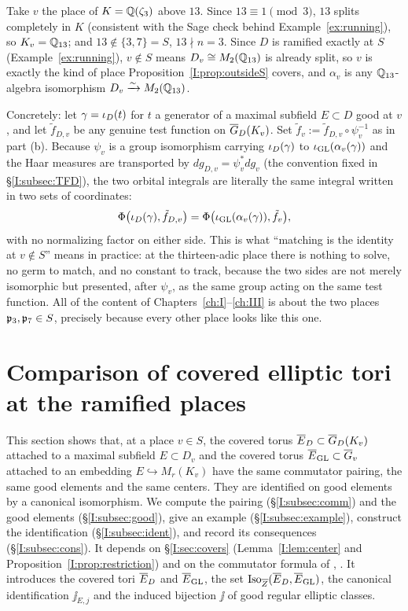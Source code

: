 \begin{example}\label{I:ex:split-matching}
Take $v$ the place of $K=\mathbb{Q}(\zeta_3)$ above $13$. Since $13\equiv1\pmod3$, $13$ splits completely in $K$ (consistent with the Sage check behind Example~\ref{ex:running}), so $K_v=\mathbb{Q}_{13}$; and $13\notin\{3,7\}=S$, $13\nmid n=3$. Since $D$ is ramified exactly at $S$ (Example~\ref{ex:running}), $v\notin S$ means $D_v\cong M_2(\mathbb{Q}_{13})$ is already split, so $v$ is exactly the kind of place Proposition~\ref{I:prop:outsideS} covers, and $\alpha_v$ is any $\mathbb{Q}_{13}$-algebra isomorphism $D_v\xrightarrow{\sim}M_2(\mathbb{Q}_{13})$.

Concretely: let $\gamma=\iota_D(t)$ for $t$ a generator of a maximal subfield $E\subset D$ good at $v$, and let $\tilde f_{D,v}$ be any genuine test function on $\overline{G}_D(K_v)$. Set $\tilde f_v:=\tilde f_{D,v}\circ\psi_v^{-1}$ as in part (b). Because $\psi_v$ is a group isomorphism carrying $\iota_D(\gamma)$ to $\iota_{\mathrm{GL}}(\alpha_v(\gamma))$ and the Haar measures are transported by $dg_{D,v}=\psi_v^*dg_v$ (the convention fixed in \S\ref{I:subsec:TFD}), the two orbital integrals are literally the same integral written in two sets of coordinates:
\[
\Phi\bigl(\iota_D(\gamma),\tilde f_{D,v}\bigr)=\Phi\bigl(\iota_{\mathrm{GL}}(\alpha_v(\gamma)),\tilde f_v\bigr),
\]
with no normalizing factor on either side. This is what ``matching is the identity at $v\notin S$'' means in practice: at the thirteen-adic place there is nothing to solve, no germ to match, and no constant to track, because the two sides are not merely isomorphic but presented, after $\psi_v$, as the same group acting on the same test function. All of the content of Chapters~\ref{ch:I}--\ref{ch:III} is about the two places $\mathfrak p_3,\mathfrak p_7\in S$, precisely because every other place looks like this one.
\end{example}

\section{Comparison of covered elliptic tori at the ramified places}\label{I:sec:tori}
This section shows that, at a place $v\in S$, the covered torus $\overline{E}_D\subset\overline{G}_D(K_v)$ attached to a maximal subfield $E\subset D_v$ and the covered torus $\overline{E}_{\mathrm{GL}}\subset\overline{G}_v$ attached to an embedding $E\hookrightarrow M_r(K_v)$ have the same commutator pairing, the same good elements and the same centers. They are identified on good elements by a canonical isomorphism. We compute the pairing (\S\ref{I:subsec:comm}) and the good elements (\S\ref{I:subsec:good}), give an example (\S\ref{I:subsec:example}), construct the identification (\S\ref{I:subsec:ident}), and record its consequences (\S\ref{I:subsec:cons}). It depends on \S\ref{I:sec:covers} (Lemma~\ref{I:lem:center} and Proposition~\ref{I:prop:restriction}) and on the commutator formula of \cite[\S3]{FK86}, \cite[Prop.~0.1.5]{KP84}. It introduces the covered tori $\overline{E}_D$ and $\overline{E}_{\mathrm{GL}}$, the set $\operatorname{Iso}_{\overline{Z}}(\overline{E}_D,\overline{E}_{\mathrm{GL}})$, the canonical identification $\jj_{E,j}$ and the induced bijection $\jj$ of good regular elliptic classes.

